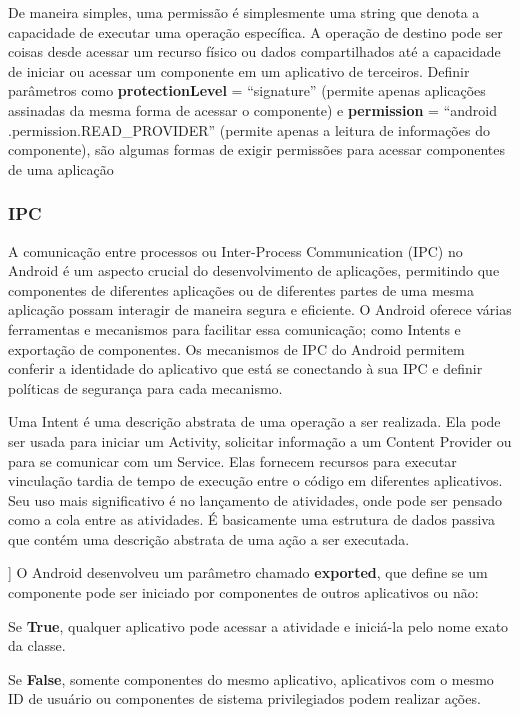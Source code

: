     De maneira simples, uma permissão é simplesmente uma string que denota a capacidade de executar uma operação específica. A operação de destino pode ser coisas desde acessar um recurso físico ou dados compartilhados até a capacidade de iniciar ou acessar um componente em um aplicativo de terceiros. Definir parâmetros como  \textbf{protectionLevel} = ``signature'' (permite apenas aplicações assinadas da mesma forma de acessar o componente) e  \textbf{permission} = ``android .permission.READ\_PROVIDER'' (permite apenas a leitura de informações do componente), são algumas formas de exigir permissões para acessar componentes de uma aplicação
    
    \subsubsection{IPC}
    A comunicação entre processos ou Inter-Process Communication (IPC) no Android é um aspecto crucial do desenvolvimento de aplicações, permitindo que componentes de diferentes aplicações ou de diferentes partes de uma mesma aplicação possam interagir de maneira segura e eficiente. O Android oferece várias ferramentas e mecanismos para facilitar essa comunicação; como Intents e exportação de componentes. Os mecanismos de IPC do Android permitem conferir a identidade do aplicativo que está se conectando à sua IPC e definir políticas de segurança para cada mecanismo.

    Uma Intent é uma descrição abstrata de uma operação a ser realizada. Ela pode ser usada para iniciar um Activity, solicitar informação a um Content Provider ou para se comunicar com um Service. Elas fornecem recursos para executar vinculação tardia de tempo de execução entre o código em diferentes aplicativos. Seu uso mais significativo é no lançamento de atividades, onde pode ser pensado como a cola entre as atividades. É basicamente uma estrutura de dados passiva que contém uma descrição abstrata de uma ação a ser executada.

    ]
    O Android desenvolveu um parâmetro chamado \textbf{exported}, que define se um componente pode ser iniciado por componentes de outros aplicativos ou não:

    Se \textbf{True}, qualquer aplicativo pode acessar a atividade e iniciá-la pelo nome exato da classe.
    
    Se \textbf{False}, somente componentes do mesmo aplicativo, aplicativos com o mesmo ID de usuário ou componentes de sistema privilegiados podem realizar ações.

